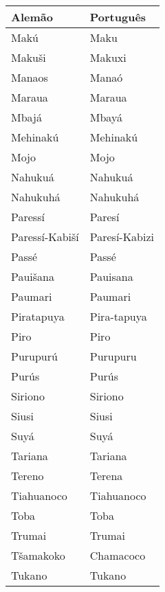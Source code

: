 \begin{center}
\begin{tabular}{ | m{12em} | m{4.2cm}| } 
\hline
\textbf{Alemão} & \textbf{Português} \\ [0.5ex] 
\hline\hline
Makú              	       	& Maku \\
\hline
Makuši            	       	& Makuxi \\
\hline
Manaos            	       	& Manaó \\
\hline
Maraua            	       	& Maraua \\
\hline
Mbajá             	       	& Mbayá \\
\hline
Mehinakú          	       	& Mehinakú \\
\hline
Mojo              	       	& Mojo \\
\hline
Nahukuá           	       	& Nahukuá \\
\hline
Nahukuhá          	       	& Nahukuhá \\
\hline
Paressí           	       	& Paresí \\
\hline
Paressí-Kabiší    	       	& Paresí-Kabizi \\
\hline
Passé             	       	& Passé \\
\hline
Pauišana          	       	& Pauisana \\
\hline
Paumari           	       	& Paumari \\
\hline
Piratapuya        	       	& Pira-tapuya \\
\hline
Piro              	       	& Piro \\
\hline
Purupurú          	       	& Purupuru \\
\hline
Purús             	       	& Purús \\
\hline
Siriono           	       	& Siriono \\
\hline
Siusi             	       	& Siusi \\
\hline
Suyá              	       	& Suyá \\
\hline
Tariana           	       	& Tariana \\
\hline
Tereno            	       	& Terena \\
\hline
Tiahuanoco        	       	& Tiahuanoco \\
\hline
Toba              	       	& Toba \\
\hline
Trumai            	       	& Trumai \\
\hline
Tšamakoko         	       	& Chamacoco \\
\hline
Tukano            	       	& Tukano \\

\end{tabular}
\end{center}
